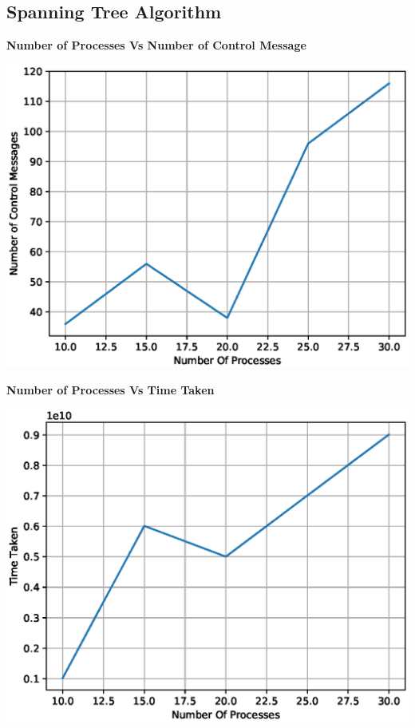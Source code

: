 \documentclass[a4paper,12pt]{report}
\begin{document}
\subsection{Spanning Tree Algorithm}
\begin{center}
\begin{large}
\textbf{Number of Processes Vs Number of Control Message}\\
\end{large}
\includegraphics[scale=0.7]{./ncm.eps}
\end{center}
\begin{center}
\begin{large}
\textbf{Number of Processes Vs Time Taken}\\
\end{large}
\includegraphics[scale=0.7]{./tt.eps}
\end{center}
\end{document}
